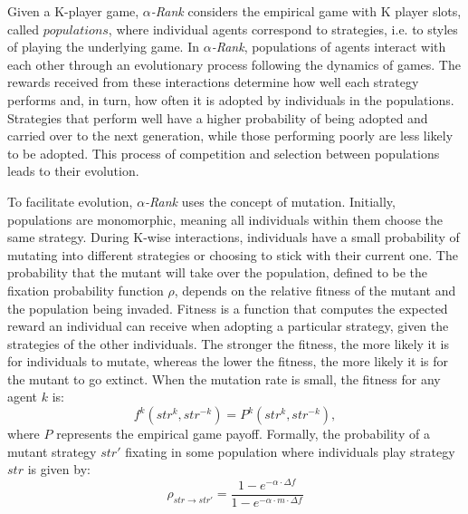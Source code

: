         Given a K-player game, \emph{$\alpha$-Rank} considers the empirical game with K player slots, called $populations$, where individual agents correspond to strategies, i.e. to styles of playing the underlying game. In \emph{$\alpha$-Rank}, populations of agents interact with each other through an evolutionary process following the dynamics of games. The rewards received from these interactions determine how well each strategy performs and, in turn, how often it is adopted by individuals in the populations. Strategies that perform well have a higher probability of being adopted and carried over to the next generation, while those performing poorly are less likely to be adopted. This process of competition and selection between populations leads to their evolution.\tinydouble

        \noindent
        To facilitate evolution, \emph{$\alpha$-Rank} uses the concept of mutation. Initially, populations are monomorphic, meaning all individuals within them choose the same strategy. During K-wise interactions, individuals have a small probability of mutating into different strategies or choosing to stick with their current one. The probability that the mutant will take over the population, defined to be the fixation probability function $\rho$, depends on the relative fitness of the mutant and the population being invaded. Fitness is a function that computes the expected reward an individual can receive when adopting a particular strategy, given the strategies of the other individuals. The stronger the fitness, the more likely it is for individuals to mutate, whereas the lower the fitness, the more likely it is for the mutant to go extinct. When the mutation rate is small, the fitness for any agent $k$ is:
        \begin{equation}
            f^k(str^{k}, str^{-k}) = P^k(str^{k}, str^{-k}),
            \label{eq:fitness_k}
        \end{equation}
        where $P$ represents the empirical game payoff. Formally, the probability of a mutant strategy $str'$ fixating in some population where individuals play strategy $str$ is given by:
        \begin{equation}
            \rho_{str \to str'} = \frac{1 - e^{-\alpha \cdot \Delta f}}{1 - e^{-\alpha \cdot m \cdot \Delta f}} 
            \label{eq:fixation_prob}
        \end{equation}
